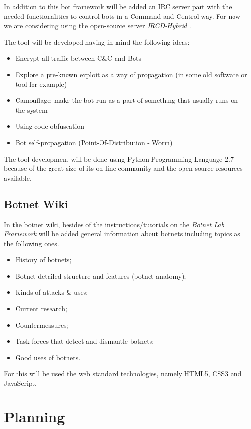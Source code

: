 \documentclass[]{article}
\begin{document}
In addition to this bot framework will be added an IRC server part with the needed functionalities to control bots in a Command and Control way. For now we are considering using the open-source server \textit{IRCD-Hybrid} \cite{app:ircdhybrid}.

The tool will be developed having in mind the following ideas:
\begin{itemize}
	\item Encrypt all traffic between C\&C and Bots
	\item Explore a pre-known exploit as a way of propagation (in some old software or tool for example)
	\item Camouflage: make the bot run as a part of something that usually runs on the system
	\item Using code obfuscation
	\item Bot self-propagation (Point-Of-Distribution - Worm)
\end{itemize}

The tool development will be done using Python Programming Language 2.7 \cite{app:python} because of the great size of its on-line community and the open-source resources available.

\subsection{Botnet Wiki}

In the botnet wiki, besides of the instructions/tutorials on the \textit{Botnet Lab Framework} will be added general information about botnets including topics as the following ones.
\begin{itemize}
	\item History of botnets;
	\item Botnet detailed structure and features (botnet anatomy);
	\item Kinds of attacks \& uses;
	\item Current research;
	\item Countermeasures;
	\item Task-forces that detect and dismantle botnets;
	\item Good uses of botnets.
\end{itemize}

For this will be used the web standard technologies, namely HTML5, CSS3 and JavaScript.

\section{Planning}


 
\end{document}
